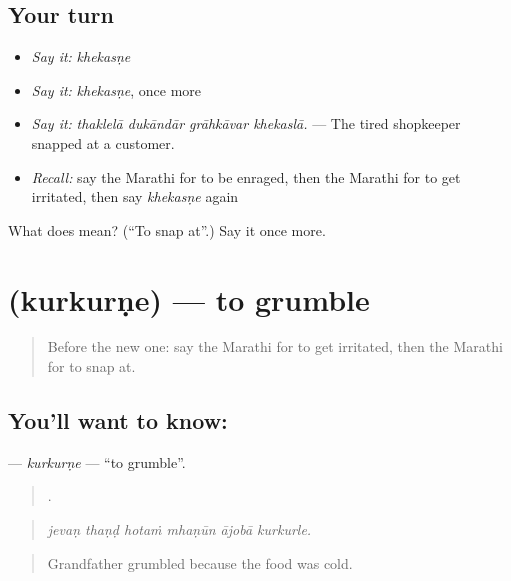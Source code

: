 \subsection*{Your turn}
\begin{itemize}
\raggedright
  \item \emph{Say it:} \emph{khekasṇe}
  \item \emph{Say it:} \emph{khekasṇe}, once more
  \item \emph{Say it:} \emph{thaklelā dukāndār grāhkāvar khekaslā.} — The tired shopkeeper snapped at a customer.
  \item \emph{Recall:} say the Marathi for to be enraged, then the Marathi for to get irritated, then say \emph{khekasṇe} again
\end{itemize}

\begin{tcolorbox}[breakable,colback=teal!4,colframe=teal!35!black,title={Before you move on}]
What does  mean? (\textquotedblleft{}To snap at\textquotedblright{}.) Say it once more.
\end{tcolorbox}
\section[\texorpdfstring{\mr{कुरकुरणे} (kurkurṇe)}{कुरकुरणे (kurkurṇe)}]{ (kurkurṇe) — to grumble}

\label{lesson:MR-C453-kurkurne}



\begin{quote}
Before the new one: say the Marathi for to get irritated, then the Marathi for to snap at.
\end{quote}

\subsection*{You'll want to know: }
\textbf{} — \emph{kurkurṇe} — \textquotedblleft{}to grumble\textquotedblright{}.

\begin{quote}
     .
\end{quote}

\begin{quote}
\emph{jevaṇ thaṇḍ hotaṁ mhaṇūn ājobā kurkurle.}
\end{quote}

\begin{quote}
Grandfather grumbled because the food was cold.
\end{quote}

